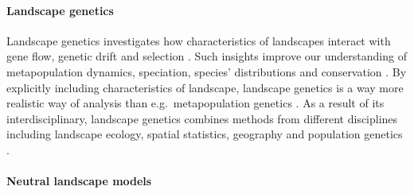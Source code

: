 \documentclass[smallextended]{svjour3}       %
\begin{document}
\hypertarget{sec:landscape_genetics}{%
\paragraph{Landscape genetics}\label{sec:landscape_genetics}}

Landscape genetics investigates how characteristics of landscapes
interact with gene flow, genetic drift and selection \cite{Manel2003}.
Such insights improve our understanding of metapopulation dynamics,
speciation, species' distributions and conservation \cite{Storfer2007}.
By explicitly including characteristics of landscape, landscape genetics
is a way more realistic way of analysis than e.g.~metapopulation
genetics \cite{Holderegger2006}. As a result of its interdisciplinary,
landscape genetics combines methods from different disciplines including
landscape ecology, spatial statistics, geography and population genetics
\cite{Storfer2007}.

\hypertarget{sec:NLM}{%
\paragraph{Neutral landscape models}\label{sec:NLM}}



\end{document}
